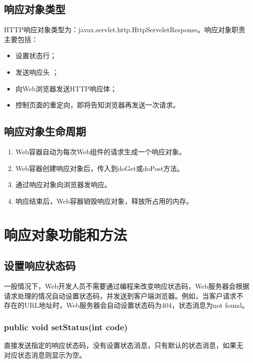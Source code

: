 \subsection{响应对象类型} 

HTTP响应对象类型为：javax.servlet.http.HttpServeletResponse。响应对象职责主要包括：

\begin{itemize}
\item 设置状态行；
\item 发送响应头 ；
\item 向Web浏览器发送HTTP响应体；
\item 控制页面的重定向，即将告知浏览器再发送一次请求。
\end{itemize}

\subsection{响应对象生命周期}

\begin{enumerate}
\item Web容器自动为每次Web组件的请求生成一个响应对象。
\item Web容器创建响应对象后，传入到doGet或doPost方法。
\item 通过响应对象向浏览器发响应。
\item 响应结束后，Web容器销毁响应对象，释放所占用的内存。
\end{enumerate}

\section{响应对象功能和方法}

\subsection{设置响应状态码} 

一般情况下，Web开发人员不需要通过编程来改变响应状态码，Web服务器会根据
请求处理的情况自动设置状态码，并发送到客户端浏览器。例如，当客户请求不
存在的URL地址时，Web服务器会自动设置状态码为404，状态消息为not found。

\subsubsection{public void setStatus(int code)}

直接发送指定的响应状态码，没有设置状态消息，只有默认的状态消息，如果无
对应状态消息则显示为空。

